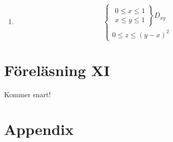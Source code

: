 \documentclass[a4paper]{article}
\begin{document}
\begin{enumerate}
\item 
$$
\begin{cases}
\left.\begin{array}{rcl}
0 \leq x \leq 1 \\
x \leq y \leq 1 \end{array}\right\}	D_{xy} \\
0 \leq z \leq (y-x)^2
\end{cases}
$$
\end{enumerate}


\newpage
\section{Föreläsning XI}

Kommer snart!









\newpage
\fancyhf{}
\section{Appendix}
\begin{appendix}
	\listoffigures
	\listoftables
\end{appendix}
\end{document}
